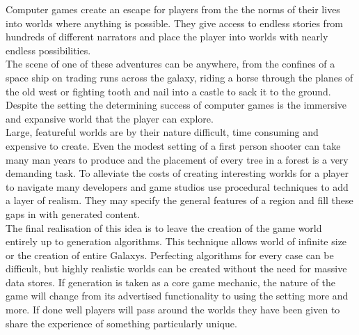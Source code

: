 Computer games create an escape for players from the the norms of their
lives into worlds where anything is possible. They give access to endless stories
from hundreds of different narrators and place the player into worlds with nearly
endless possibilities.\\

The scene of one of these adventures can be anywhere, from the confines of a 
space ship on trading runs across the galaxy, riding a horse through the planes
of the old west or fighting tooth and nail into a castle to sack it to the 
ground. Despite the setting the determining success of computer games is the
immersive and 
expansive world that the player can explore. \\

Large, featureful worlds are by their nature difficult, time consuming and 
expensive to create. Even the modest setting of a first person shooter can take
many man years to produce and the placement of every tree in a forest is a very
demanding task. To alleviate the costs of creating interesting worlds for a 
player to navigate many developers and game studios use procedural techniques to
add a layer of realism. They may specify the general features of a region and 
fill these gaps in with generated content.\\

The final realisation of this idea is to leave the creation of the game world 
entirely up to generation algorithms. This technique allows world of infinite size
or the creation of entire Galaxys. Perfecting algorithms for every case can be 
difficult, but highly realistic worlds can be created without the need for 
massive data stores. If generation is taken as a core game mechanic, the nature
of the game will change from its advertised functionality to using the setting 
more and more. If done well players will pass around the worlds they have been
given to share the experience of something particularly unique.\\
